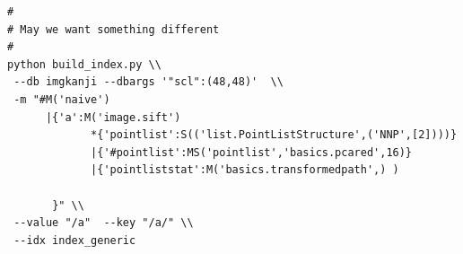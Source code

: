 \documentclass{report}
\begin{document}
\begin{lstlisting}
#
# May we want something different
#
python build_index.py \\
 --db imgkanji --dbargs '"scl":(48,48)'  \\
 -m "#M('naive')
      |{'a':M('image.sift')
             *{'pointlist':S(('list.PointListStructure',('NNP',[2])))}
             |{'#pointlist':MS('pointlist','basics.pcared',16)}
             |{'pointliststat':M('basics.transformedpath',) )

       }" \\
 --value "/a"  --key "/a/" \\
 --idx index_generic

\end{lstlisting}
\end{document}
